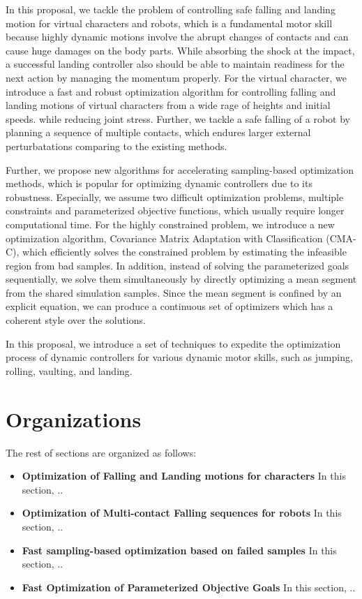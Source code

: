 In this proposal, we tackle the problem of controlling safe falling 
and landing motion for virtual characters and robots, which is a fundamental
motor skill because highly dynamic motions involve the abrupt changes
of contacts and can cause huge damages on the body parts.
While absorbing the shock at the impact, a successful landing controller 
also should be able to maintain readiness for the next action by managing
the momentum properly.
For the virtual character, we introduce a fast and robust optimization 
algorithm for controlling falling and landing motions of virtual
characters from a wide rage of heights and initial speeds.
while reducing joint stress.
Further, we tackle a safe falling of a robot by planning a sequence of
multiple contacts, which endures larger external perturbatations comparing to
the existing methods.

Further, we propose new algorithms for accelerating sampling-based 
optimization methods, which is popular for optimizing dynamic controllers
due to its robustness.
Especially, we assume two difficult optimization problems,
multiple constraints and parameterized objective functions,
which usually require longer computational time.
For the highly constrained problem, we introduce a new optimization algorithm, 
Covariance Matrix Adaptation with Classification (CMA-C), 
which efficiently solves the constrained problem by estimating
the infeasible region from bad samples.
In addition, instead of solving the parameterized goals sequentially,
we solve them simultaneously by directly optimizing a mean segment
from the shared simulation samples.
Since the mean segment is confined by an explicit equation,
we can produce a continuous set of optimizers which has
a coherent style over the solutions.

In this proposal, we introduce a set of techniques to expedite
the optimization process of dynamic controllers for various dynamic motor 
skills, such as jumping, rolling, vaulting, and landing.

\section{Organizations}
The rest of sections are organized as follows:

\begin{itemize}
\item 
  \textbf{Optimization of Falling and Landing motions for characters}
  In this section, ..
\item 
  \textbf{Optimization of Multi-contact Falling sequences for robots}
  In this section, ..
\item 
  \textbf{Fast sampling-based optimization based on failed samples}
  In this section, ..
\item 
  \textbf{Fast Optimization of Parameterized Objective Goals}
  In this section, ..
\end{itemize}

